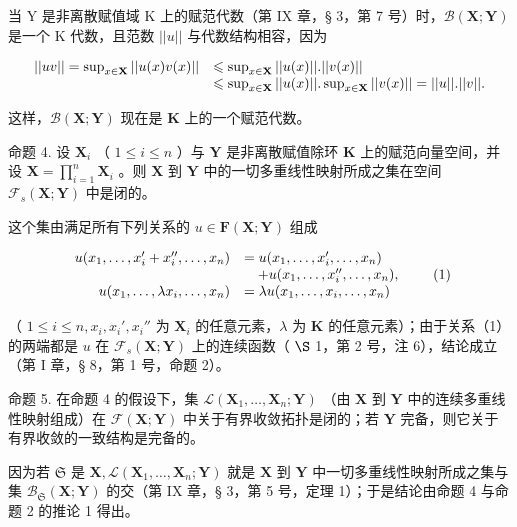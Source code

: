 当 Y 是非离散赋值域 K 上的赋范代数（第 IX 章，§ 3，第 7 号）时，\(\mathcal{B}(\mathbf{X};\mathbf{Y})\) 是一个 K 代数，且范数 \(||u||\) 与代数结构相容，因为

\[
\begin{array}{r l} | | u v | | = \sup _ {x \in \mathbf {X}} | | u (x) v (x) | | & \leqslant \sup _ {x \in \mathbf {X}} | | u (x) | |. | | v (x) | | \\ & \leqslant \sup _ {x \in \mathbf {X}} | | u (x) | |. \sup _ {x \in \mathbf {X}} | | v (x) | | = | | u | |. | | v | |. \end{array}
\]

这样，\(\mathcal{B}(\mathbf{X};\mathbf{Y})\) 现在是 \(\mathbf{K}\) 上的一个赋范代数。

命题 4. 设 \(\mathbf{X}_i\) （ \(1 \leqslant i \leqslant n\) ）与 \(\mathbf{Y}\) 是非离散赋值除环 \(\mathbf{K}\) 上的赋范向量空间，并设 \(\mathbf{X} = \prod_{i=1}^{n} \mathbf{X}_i\) 。则 \(\mathbf{X}\) 到 \(\mathbf{Y}\) 中的一切多重线性映射所成之集在空间 \(\mathcal{F}_s(\mathbf{X}; \mathbf{Y})\) 中是闭的。

这个集由满足所有下列关系的 \(u \in \mathbf{F}(\mathbf{X};\mathbf{Y})\) 组成

\[
\begin{array}{r l} u (x _ {1}, \dots , x _ {i} ^ {\prime} + x _ {i} ^ {\prime \prime}, \dots , x _ {n}) & = u (x _ {1}, \dots , x _ {i} ^ {\prime}, \dots , x _ {n}) \\ & \quad + u (x _ {1}, \dots , x _ {i} ^ {\prime \prime}, \dots , x _ {n}), \\ u (x _ {1}, \dots , \lambda x _ {i}, \dots , x _ {n}) & = \lambda u (x _ {1}, \dots , x _ {i}, \dots , x _ {n}) \end{array}\tag{1}
\]

（ \(1 \leqslant i \leqslant n, x_i, x_i', x_i''\) 为 \(\mathbf{X}_i\) 的任意元素，\(\lambda\) 为 \(\mathbf{K}\) 的任意元素）；由于关系（1）的两端都是 \(u\) 在 \(\mathcal{F}_s(\mathbf{X}; \mathbf{Y})\) 上的连续函数（ \(\S\) 1，第 2 号，注 6），结论成立（第 I 章，§ 8，第 1 号，命题 2）。

命题 5. 在命题 4 的假设下，集 \(\mathcal{L}(\mathbf{X}_1,\ldots ,\mathbf{X}_n;\mathbf{Y})\) （由 \(\mathbf{X}\) 到 \(\mathbf{Y}\) 中的连续多重线性映射组成）在 \(\mathcal{F}(\mathbf{X};\mathbf{Y})\) 中关于有界收敛拓扑是闭的；若 \(\mathbf{Y}\) 完备，则它关于有界收敛的一致结构是完备的。

因为若 \(\mathfrak{S}\) 是 \(\mathbf{X},\mathcal{L}(\mathbf{X}_1,\ldots ,\mathbf{X}_n;\mathbf{Y})\) 就是 \(\mathbf{X}\) 到 \(\mathbf{Y}\) 中一切多重线性映射所成之集与集 \(\mathcal{B}_{\mathfrak{S}}(\mathbf{X};\mathbf{Y})\) 的交（第 IX 章，§ 3，第 5 号，定理 1）；于是结论由命题 4 与命题 2 的推论 1 得出。

